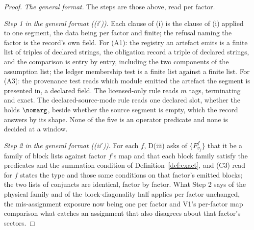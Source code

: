 \begin{proof}
\emph{The general format.} The steps are those above, read per factor.

\emph{Step 1 in the general format ((i$'$)).} Each clause of (i) is the
clause of (i) applied to one segment, the data being per factor and finite;
the refusal naming the factor is the record's own field. For (A1): the
registry an artefact emits is a finite list of triples of declared strings,
the obligation record a triple of declared strings, and the comparison is
entry by entry, including the two components of the assumption list; the
ledger membership test is a finite list against a finite list. For (A3): the
provenance test reads which module emitted the artefact the segment is
presented in, a declared field. The licensed-only rule reads $m$ tags,
terminating and exact. The declared-source-mode rule reads one declared slot,
whether the  holds $\nomarg$, beside whether the source
segment is empty, which the record answers by its shape. None of the five is
an operator predicate and none is decided at a window.

\emph{Step 2 in the general format ((ii$'$)).} For each $f$, D(iii) asks of
$\{F^{f}_{v_f}\}$ that it be a family of block lists against factor $f$'s map
and that each block family satisfy the predicates and the summation condition
of Definition~\ref{def:exact}, and (C3) read for $f$ states the type and those
same conditions on that factor's emitted blocks; the two lists of conjuncts
are identical, factor by factor. What Step 2 says of the physical family and
of the block-diagonality half applies per factor unchanged, the
mis-assignment exposure now being one per factor and V1's per-factor map
comparison what catches an assignment that also disagrees about that factor's
sectors.


\end{proof}
